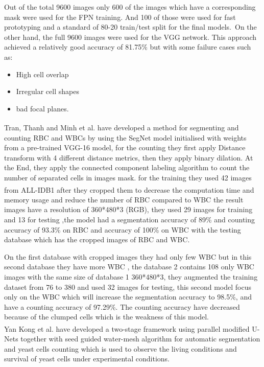 Out of the total 9600 images only 600 of the images which have a corresponding mask were used for the FPN training. And 100 of those were used for fast prototyping and a standard of 80-20 train/test split for the final models.\
On the other hand, the full 9600 images were used for the VGG network.
This approach achieved a relatively good accuracy of 81.75\% but with some failure cases such as:\

\begin{itemize}
  \item High cell overlap
  \item Irregular cell shapes
  \item bad focal planes.
\end{itemize}

Tran, Thanh and Minh et al. \textsuperscript{\cite{tran2019blood}} have developed a method for segmenting and counting RBC and WBCs by using the SegNet model initialised with weights from a pre-trained VGG-16 model, for the counting they first apply Distance transform with 4 different distance metrics, then they apply binary dilation. At the End, they apply the connected component labeling algorithm to count the number of separated cells in images mask. for the training they used 42 images from ALL-IDB1 \textsuperscript{\cite{labati2011all}} after they cropped them to decrease the computation time and memory usage and reduce the number of RBC compared to WBC the result images have a resolution of 360*480*3 (RGB), they used 29 images for training and 13 for testing ,the model had a segmentation accuracy of 89\% and counting accuracy of 93.3\% on RBC and accuracy of 100\% on WBC with the testing database which has the cropped images of RBC and WBC.\

On the first database with cropped images they had only few WBC but in this second database they have more WBC , the database 2 contains 108 only WBC images with the same size of database 1 360*480*3, they augmented the training dataset from 76 to 380 and used 32 images for testing, this second model focus only on the WBC which will increase the segmentation accuracy to 98.5\%, and have a counting accuracy of 97.29\%. The counting accuracy have decreased because of the clumped cells which is the weakness of this model.\\

Yan Kong et al. \textsuperscript{\cite{Kong:20}} have developed a two-stage framework using parallel modified U-Nets together with seed guided water-mesh algorithm for automatic segmentation and yeast cells counting which is used to observe the living conditions and survival of yeast cells under experimental conditions.\

